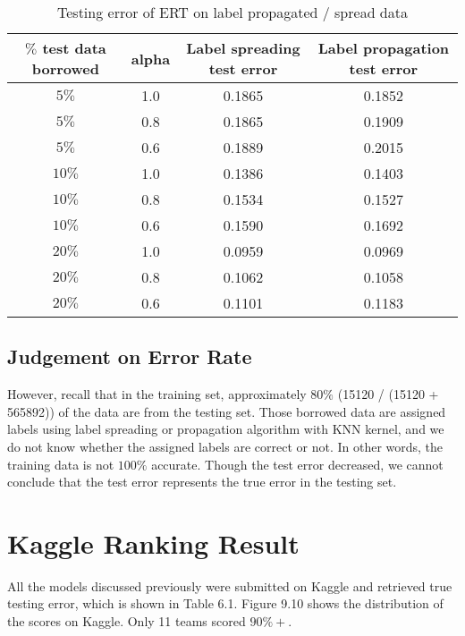 \documentclass[11pt]{article}
\begin{document}
\begin{table}[ht]
    \label{semi_sub_result}
    \centering
    \begin{small}
    \begin{tabular}{c c|c|c}
        \hline
        \textbf{$\%$ test data borrowed} & \textbf{alpha} & \textbf{Label spreading test error} & \textbf{Label propagation test error} \\ \hline
        $5\%$ & 1.0 & 0.1865 & 0.1852 \\
        $5\%$ & 0.8 & 0.1865 & 0.1909 \\
        $5\%$ & 0.6 & 0.1889 & 0.2015 \\
        $10\%$ & 1.0 & 0.1386 & 0.1403 \\
        $10\%$ & 0.8 & 0.1534 & 0.1527 \\
        $10\%$ & 0.6 & 0.1590 & 0.1692 \\
        $20\%$ & 1.0 & 0.0959 & 0.0969 \\
        $20\%$ & 0.8 & 0.1062 & 0.1058 \\
        $20\%$ & 0.6 & 0.1101 & 0.1183 \\
        \hline
    \end{tabular}
    \end{small}
    \caption{Testing error of ERT on label propagated / spread data}
\end{table}

\subsection{Judgement on Error Rate}

However, recall that in the training set, approximately 80$\%$ (15120 / (15120 + 565892)) of the data are from the testing set. Those borrowed data are assigned labels using label spreading or propagation algorithm with KNN kernel, and we do not know whether the assigned labels are correct or not. In other words, the training data is not $100\%$ accurate. Though the test error decreased, we cannot conclude that the test error represents the true error in the testing set.

\section{Kaggle Ranking Result}

All the models discussed previously were submitted on Kaggle and retrieved true testing error, which is shown in Table 6.1. Figure 9.10 shows the distribution of the scores on Kaggle. Only 11 teams scored $90\%+$.
\end{document}
